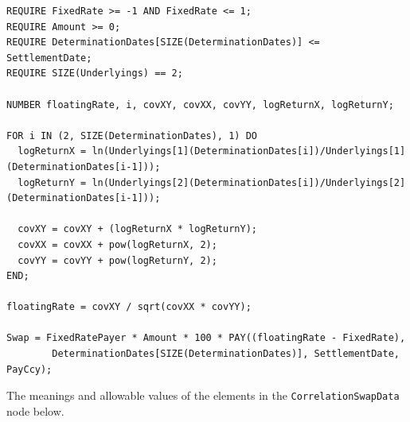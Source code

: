 \begin{listing}[hbt]
\begin{verbatim}
REQUIRE FixedRate >= -1 AND FixedRate <= 1;
REQUIRE Amount >= 0;
REQUIRE DeterminationDates[SIZE(DeterminationDates)] <= SettlementDate;
REQUIRE SIZE(Underlyings) == 2;

NUMBER floatingRate, i, covXY, covXX, covYY, logReturnX, logReturnY;

FOR i IN (2, SIZE(DeterminationDates), 1) DO
  logReturnX = ln(Underlyings[1](DeterminationDates[i])/Underlyings[1](DeterminationDates[i-1]));
  logReturnY = ln(Underlyings[2](DeterminationDates[i])/Underlyings[2](DeterminationDates[i-1]));

  covXY = covXY + (logReturnX * logReturnY);
  covXX = covXX + pow(logReturnX, 2);
  covYY = covYY + pow(logReturnY, 2);
END;

floatingRate = covXY / sqrt(covXX * covYY);

Swap = FixedRatePayer * Amount * 100 * PAY((floatingRate - FixedRate),
        DeterminationDates[SIZE(DeterminationDates)], SettlementDate, PayCcy);
\end{verbatim}
\caption{Payoff script for a Correlation Swap.}
\label{lst:correlation_swap}
\end{listing}

The meanings and allowable values of the elements in the \lstinline!CorrelationSwapData! node below.

